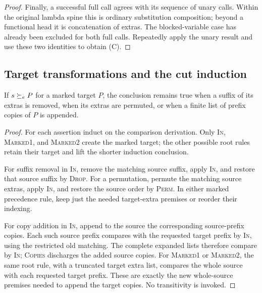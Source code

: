 \begin{proof}
Finally, a successful full call agrees with its
sequence of unary calls. Within the original
lambda spine this is ordinary substitution
composition; beyond a functional head it is
concatenation of extras. The blocked-variable
case has already been excluded for both full
calls. Repeatedly apply the unary result and
use these two identities to obtain (C).
\end{proof}

\subsection{Target transformations and the cut induction}

\begin{lemma}\label{lem:target-macros}
If $s\succeq_e P$ for a marked target $P$, the conclusion
remains true when a suffix of its extras is removed,
when its extras are permuted, or when a finite list
of prefix copies of $P$ is appended.
\end{lemma}
\begin{proof}
For each assertion induct on the comparison derivation.
Only \textsc{In}, \textsc{Marked1}, and
\textsc{Marked2} create the marked target;
the other possible root rules retain their target
and lift the shorter induction conclusion.

For suffix removal in \textsc{In}, remove the
matching source suffix, apply \textsc{In}, and
restore that source suffix by \textsc{Drop}.
For a permutation, permute the matching source
extras, apply \textsc{In}, and restore the source
order by \textsc{Perm}. In either marked precedence
rule, keep just the needed target-extra premises
or reorder their indexing.

For copy addition in \textsc{In}, append to the
source the corresponding source-prefix copies.
Each such source prefix compares with the
requested target prefix by \textsc{In}, using
the restricted old matching. The complete
expanded lists therefore compare by
\textsc{In}; \textsc{Copies} discharges the
added source copies.
For \textsc{Marked1} or \textsc{Marked2}, the
same root rule, with a truncated target extra
list, compares the whole source with each
requested target prefix. These are exactly the
new whole-source premises needed to append
the target copies. No transitivity is invoked.
\end{proof}

